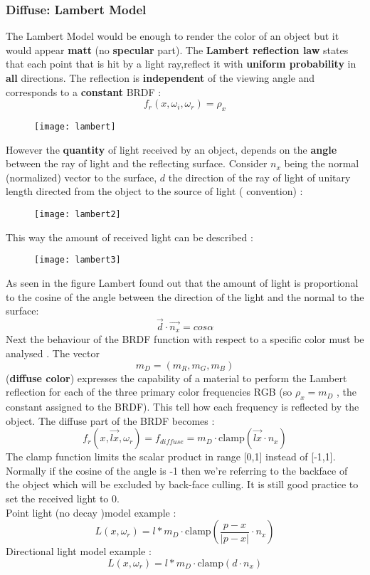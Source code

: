 \subsubsection{Diffuse: Lambert Model} 
The Lambert Model would be enough to render the color of an object but it would appear \textbf{matt} (no \textbf{specular} part). The \textbf{Lambert reflection law} states that each point that is hit by a light ray,reflect it with \textbf{uniform probability} in \textbf{all} directions. The reflection is \textbf{independent} of the viewing angle and corresponds to a \textbf{constant} BRDF : 
$$ f_r(x,\omega_i,\omega_r)=\rho_x$$
\begin{figure}[H]
  \centering
  \texttt{[image: lambert]}
\end{figure}
However the \textbf{quantity} of light received by an object, depends on the \textbf{angle} between the ray of light and the reflecting surface. Consider $n_x$ being the normal (normalized) vector to the surface, $d$ the direction of the ray of light  of unitary length directed from the object to the source of light ( convention) :
\begin{figure}[H]
  \centering
  \texttt{[image: lambert2]}
\end{figure}
This way the amount of received light can be described :
\begin{figure}[H]
  \centering
  \texttt{[image: lambert3]}
\end{figure}
As seen in the figure Lambert found out that the amount of light is proportional to the cosine of the angle between the direction of the light and the normal to the surface: $$ \vec{d} \cdot \vec{n_x} = cos\alpha$$
Next the behaviour of the BRDF function with respect to a specific color must be analysed . The vector $$ m_D = (m_R,m_G,m_B)$$ (\textbf{diffuse color}) expresses the capability of a material to perform  the Lambert reflection for each of the three primary color frequencies RGB (so $\rho_x = m_D$	, the constant assigned to the BRDF). This tell how each frequency is reflected by the object.
The diffuse part of the BRDF becomes :
\[
\boxed{f_r(x,\vec{lx},\omega_r)=f_{diffuse}=m_D \cdot \text{clamp}(\vec{lx} \cdot n_x)}
\]
The clamp function limits the scalar product in range [0,1] instead of [-1,1]. Normally if the cosine of the angle is -1 then we're referring to the backface of the object which will be excluded by back-face culling. It is still good practice to set the received light to 0.\\
Point light (no decay )model example :
$$ L(x,\omega_r) = l * m_D \cdot \text{clamp} \left( \frac{p-x}{|p-x|} \cdot n_x \right)$$
Directional light model example :
$$ L(x,\omega_r) = l * m_D \cdot \text{clamp} \left( d \cdot n_x \right)$$

